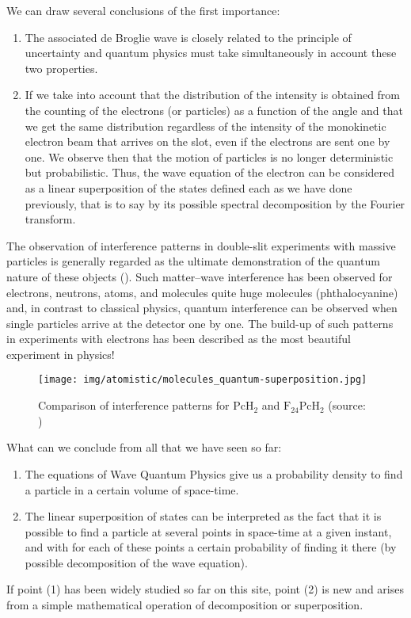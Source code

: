 	We can draw several conclusions of the first importance:
	\begin{enumerate}
		\item The associated de Broglie wave  is closely related to the principle of uncertainty and quantum physics must take simultaneously in account these two properties.

		\item If we take into account that the distribution of the intensity is obtained from the counting of the electrons (or particles) as a function of the angle and that we get the same distribution regardless of the intensity of the monokinetic electron beam that arrives on the slot, even if the electrons are sent one by one. We observe then that the motion of particles is no longer deterministic but probabilistic. Thus, the wave equation of the electron can be considered as a linear superposition of the states defined each as we have done previously, that is to say by its possible spectral decomposition by the Fourier transform.
	\end{enumerate}
	The observation of interference patterns in double-slit experiments with massive particles is generally regarded as the ultimate demonstration of the quantum nature of these objects (). Such matter–wave interference has been observed for electrons, neutrons, atoms, and molecules quite huge molecules (phthalocyanine) and, in contrast to classical physics, quantum interference can be observed when single particles arrive at the detector one by one. The build-up of such patterns in experiments with electrons has been described as the most beautiful experiment in physics!
	\begin{figure}[H]
		\centering
		\texttt{[image: img/atomistic/molecules\_quantum-superposition.jpg]}
		\caption[Comparison of interference patterns]{Comparison of interference patterns for $\mathrm{PcH}_2$ and $\mathrm{F}_{24}\mathrm{PcH}_2$ (source: \cite{juffmann2012real})}
	\end{figure}
	What can we conclude from all that we have seen so far:
	\begin{enumerate}
		\item The equations of Wave Quantum Physics give us a probability density to find a particle in a certain volume of space-time.

		\item The linear superposition of states can be interpreted as the fact that it is possible to find a particle at several points in space-time at a given instant, and with for each of these points a certain probability of finding it there (by possible decomposition of the wave equation).
	\end{enumerate}
	If point (1) has been widely studied so far on this site, point (2) is new and arises from a simple mathematical operation of decomposition or superposition.
	
